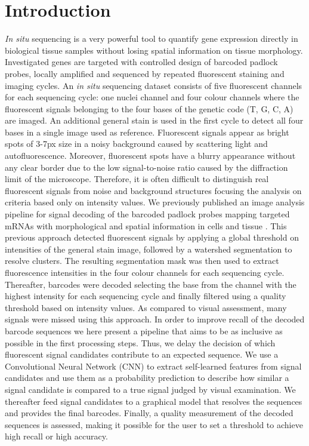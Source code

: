 \documentclass[10pt,journal]{IEEEtran}
\begin{document}


\section{Introduction}
\textit{In situ} sequencing \cite{ke2013situ} is a very powerful tool to quantify gene expression directly in biological tissue samples without losing spatial information on tissue morphology. Investigated genes are targeted with controlled design of barcoded padlock probes, locally amplified and sequenced by repeated fluorescent staining and imaging cycles.
An \textit{in situ} sequencing dataset consists of five fluorescent channels for each sequencing cycle: one nuclei channel and four colour channels where the fluorescent signals belonging to the four bases of the genetic code (T, G, C, A) are imaged.
An additional general stain is used in the first cycle to detect all four bases in a single image used as reference.
Fluorescent signals appear as bright spots of 3-7px size in a noisy background caused by scattering light and autofluorescence. Moreover, fluorescent spots have a blurry appearance without any clear border due to the low signal-to-noise ratio caused by the diffraction limit of the microscope. Therefore, it is often difficult to distinguish real fluorescent signals from noise and background structures focusing the analysis on criteria based only on intensity values.
We previously published an image analysis pipeline for signal decoding of the barcoded padlock probes mapping targeted mRNAs with morphological and spatial information in cells and tissue \cite{pacureanu2014image}.
This previous approach detected fluorescent signals by applying a global threshold on intensities of the general stain image, followed by a watershed segmentation to resolve clusters. The resulting segmentation mask was then used to extract fluorescence intensities in the four colour channels for each sequencing cycle. Thereafter, barcodes were decoded selecting the base from the channel with the highest intensity for each sequencing cycle and finally filtered using a quality threshold based on intensity values.
As compared to visual assessment, many signals were missed using this approach.
In order to improve recall of the decoded barcode sequences we here present a pipeline that aims to be as inclusive as possible in the first processing steps. Thus, we delay the decision of which fluorescent signal candidates contribute to an expected sequence.
We use a Convolutional Neural Network (CNN) to extract self-learned features from signal candidates and use them as a probability prediction to describe how similar a signal candidate is compared to a true signal judged by visual examination. We thereafter feed signal candidates to a graphical model that resolves the sequences and provides the final barcodes. Finally, a quality measurement of the decoded sequences is assessed, making it possible for the user to set a threshold to achieve high recall or high accuracy.
\end{document}
